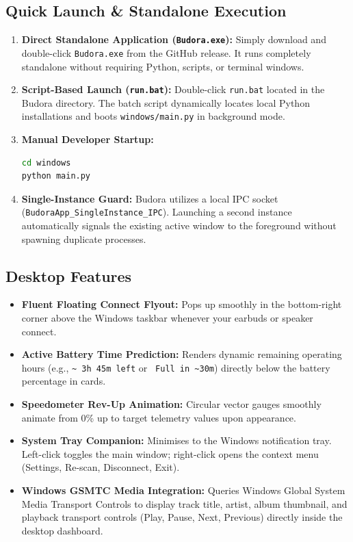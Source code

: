 \documentclass[11pt,a4paper]{article}
\begin{document}
\subsection{Quick Launch \& Standalone Execution}
\begin{enumerate}
    \item \textbf{Direct Standalone Application (\texttt{Budora.exe}):} Simply download and double-click \texttt{Budora.exe} from the GitHub release. It runs completely standalone without requiring Python, scripts, or terminal windows.
    \item \textbf{Script-Based Launch (\texttt{run.bat}):} Double-click \texttt{run.bat} located in the Budora directory. The batch script dynamically locates local Python installations and boots \texttt{windows/main.py} in background mode.
    \item \textbf{Manual Developer Startup:}
    \begin{lstlisting}[language=bash]
cd windows
python main.py
    \end{lstlisting}
    \item \textbf{Single-Instance Guard:} Budora utilizes a local IPC socket (\texttt{BudoraApp\_SingleInstance\_IPC}). Launching a second instance automatically signals the existing active window to the foreground without spawning duplicate processes.
\end{enumerate}

\subsection{Desktop Features}
\begin{itemize}
    \item \textbf{Fluent Floating Connect Flyout:} Pops up smoothly in the bottom-right corner above the Windows taskbar whenever your earbuds or speaker connect.
    \item \textbf{Active Battery Time Prediction:} Renders dynamic remaining operating hours (e.g., \texttt{\~{} 3h 45m left} or \texttt{\lightning{} Full in \~{}30m}) directly below the battery percentage in cards.
    \item \textbf{Speedometer Rev-Up Animation:} Circular vector gauges smoothly animate from 0\% up to target telemetry values upon appearance.
    \item \textbf{System Tray Companion:} Minimises to the Windows notification tray. Left-click toggles the main window; right-click opens the context menu (Settings, Re-scan, Disconnect, Exit).
    \item \textbf{Windows GSMTC Media Integration:} Queries Windows Global System Media Transport Controls to display track title, artist, album thumbnail, and playback transport controls (Play, Pause, Next, Previous) directly inside the desktop dashboard.
\end{itemize}
\end{document}
